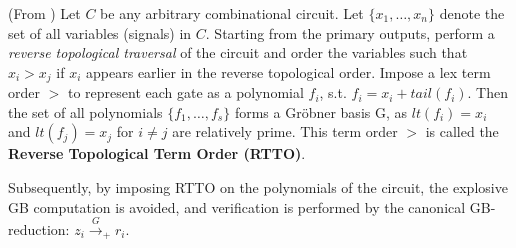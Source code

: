 \begin{Proposition} \label{prop:top-order}
(From \cite{lv:tcad2013}) Let $C$ be any arbitrary combinational
  circuit. Let $\{x_1, \dots, x_n\}$ denote the set of all variables
  (signals) in $C$. Starting from the primary outputs, perform
  a {\it reverse topological traversal} of the circuit and order the
  variables such that $x_i > x_j$ if $x_i$ appears earlier in the
  reverse topological order. Impose a lex term order $>$ to represent each
  gate as a polynomial $f_i$, s.t. $f_i = x_i + tail(f_i)$. Then the set of all polynomials  $\{f_1, \dots, 
  f_s\}$ forms a Gr\"obner basis G, as $lt(f_i)=x_i$ and $lt(f_j)=x_j$ for
  $i\neq j$ are relatively prime. This term order $>$ is called the
  {\bf Reverse Topological Term Order (RTTO)}.
\end{Proposition}

Subsequently, by imposing RTTO on the polynomials of the circuit, the
explosive GB computation is avoided, and verification is performed by
the canonical GB-reduction: $z_i \xrightarrow{G}_+r_i$. 

